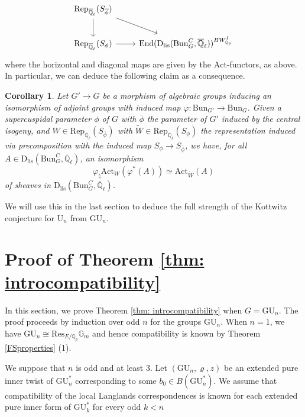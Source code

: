 \documentclass[reqno,11pt]{amsart}
\newtheorem{corollary}[theorem]{Corollary}
\theoremstyle{remark}
\newcommand{\GU}{\mathrm{GU}}
\newcommand{\U}{\mathrm{U}}
\newcommand{\Res}{\mathrm{Res}}
\newcommand{\Gm}{{\mathbb{G}_m}}
\newcommand{\Q}{\mathbb{Q}}
\newcommand{\Act}{\mathrm{Act}}
\newcommand{\Bun}{\mathrm{Bun}}
\newcommand{\Rep}{\mathrm{Rep}}
\newcommand{\Dlis}{\mathrm{D}_{\mathrm{lis}}}
\def\ol{\overline}
\def\ra{\rightarrow}
\begin{document}
\begin{equation*}
\begin{tikzcd}
\Rep_{\ol{\mathbb{Q}}_{\ell}}(S_{\ol{\phi}}) \arrow[dr] \arrow[d] & \\
\Rep_{\ol{\mathbb{Q}}_{\ell}}(S_{\phi}) \arrow[r] &  \mathrm{End}(\Dlis(\Bun_{G}^{C},\ol{\mathbb{Q}}_{\ell}))^{BW_{\mathbb{Q}_{p}}^{I}}
\end{tikzcd}    
\end{equation*}
where the horizontal and diagonal maps are given by the $\Act$-functors, as above. In particular, we can deduce the following claim as a consequence.
\begin{corollary}{\label{actcentralisog}}
Let $G' \ra G$ be a morphism of algebraic groups inducing an isomorphism of adjoint groups with induced map $\varphi: \Bun_{G'} \ra \Bun_{G}$. Given a supercuspidal parameter $\phi$ of $G$ with $\ol{\phi}$ the parameter of $G'$ induced by the central isogeny, and $W \in \Rep_{\ol{\mathbb{Q}}_{\ell}}(S_{\ol{\phi}})$ with $\widetilde{W} \in \Rep_{\ol{\mathbb{Q}}_{\ell}}(S_{\phi})$ the representation induced via precomposition with the induced map $S_{\phi} \ra S_{\ol{\phi}}$, we have, for all $A \in \Dlis(\Bun_{G}^{C},\ol{\mathbb{Q}}_{\ell})$, an isomorphism 
\[ \varphi_{\natural}\Act_{W}(\varphi^{*}(A)) \simeq \Act_{\tilde{W}}(A) \]
of sheaves in $\Dlis(\Bun_{G}^{C},\ol{\mathbb{Q}}_{\ell})$. 
\end{corollary}
We will use this in the last section to deduce the full strength of the Kottwitz conjecture for $\U_{n}$ from $\GU_{n}$.
\section{Proof of Theorem \ref{thm: introcompatibility}}{\label{s: proofofcomp}}

In this section, we prove Theorem \ref{thm: introcompatibility} when $G = \GU_{n}$. The proof proceeds by induction over odd $n$ for the groups $\GU_n$. When $n=1$, we have $\GU_n \cong \Res_{E/\Q_p}\Gm$ and hence compatibility is known by Theorem \ref{FSproperties} (1).

We suppose that $n$ is odd and at least $3$. Let $(\GU_n, \varrho, z)$ be an extended pure inner twist of $\GU^*_n$ corresponding to some $b_0 \in B(\GU^*_n)$. We assume that compatibility of the local Langlands correspondences is known for each extended pure inner form of $\GU^*_k$ for every odd $k<n$ 
\end{document}
